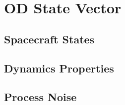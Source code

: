 \section{OD State Vector}

\subsection{Spacecraft States}

\subsection{Dynamics Properties}

\subsection{Process Noise}
